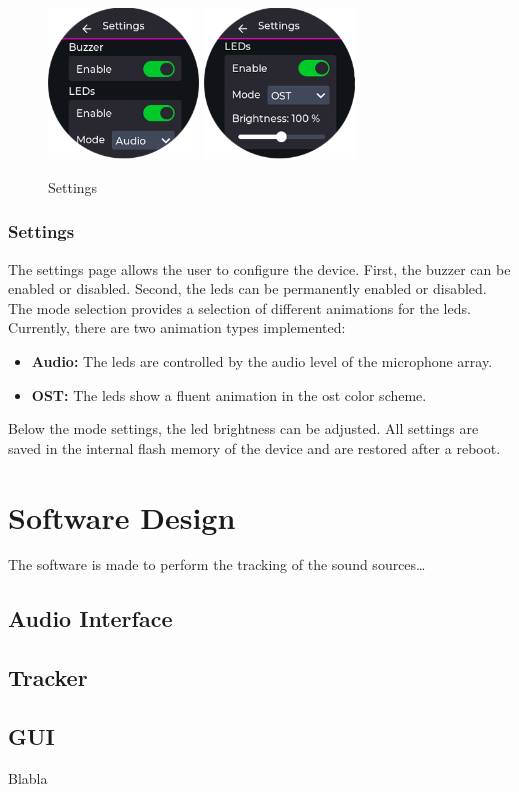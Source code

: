 \begin{minipage}{\linewidth}
	\begin{figure}
		\vspace{-0.6cm}
		\includegraphics[width=4cm, trim={0 -1.0cm 0 0}]{images/6_design_final/gui/13_settings.png}
		\includegraphics[width=4cm]{images/6_design_final/gui/14_settings.png}
		\centering
		\caption{Settings}
		\label{fig:final_design_gui_settings}
	\end{figure}
	\subsubsection{Settings}
	The settings page allows the user to configure the device.
	First, the buzzer can be enabled or disabled.
	Second, the \acrshort{led}s can be permanently enabled or disabled.
	The mode selection provides a selection of different animations for the \acrshort{led}s.
	Currently, there are two animation types implemented:
	\begin{itemize}
		\setlength{\itemindent}{5mm}
		\setlength{\leftmargin}{10mm}
		\item \textbf{Audio:} The \acrshort{led}s are controlled by the audio level of the microphone array.
		\item \textbf{OST:} The \acrshort{led}s show a fluent animation in the \acrshort{ost} color scheme.
	\end{itemize}
	Below the mode settings, the \acrshort{led} brightness can be adjusted.
	All settings are saved in the internal flash memory of the device and are restored after a reboot.
\end{minipage}


\newpage
\section{Software Design}
The software is made to perform the tracking of the sound sources\dots

\subsection{Audio Interface}

\subsection{Tracker}


\subsection{GUI}


Blabla
